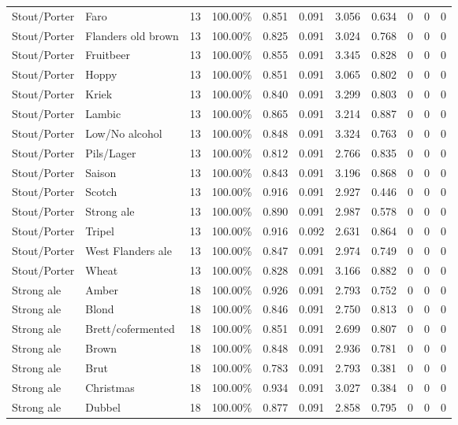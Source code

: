 {\begin{longtable}{llrrrrrrrrr}
Stout/Porter & Faro & 13 & 100.00\% & 0.851 & 0.091 & 3.056 & 0.634 & 0 & 0 & 0 \\
Stout/Porter & Flanders old brown & 13 & 100.00\% & 0.825 & 0.091 & 3.024 & 0.768 & 0 & 0 & 0 \\
Stout/Porter & Fruitbeer & 13 & 100.00\% & 0.855 & 0.091 & 3.345 & 0.828 & 0 & 0 & 0 \\
Stout/Porter & Hoppy & 13 & 100.00\% & 0.851 & 0.091 & 3.065 & 0.802 & 0 & 0 & 0 \\
Stout/Porter & Kriek & 13 & 100.00\% & 0.840 & 0.091 & 3.299 & 0.803 & 0 & 0 & 0 \\
Stout/Porter & Lambic & 13 & 100.00\% & 0.865 & 0.091 & 3.214 & 0.887 & 0 & 0 & 0 \\
Stout/Porter & Low/No alcohol & 13 & 100.00\% & 0.848 & 0.091 & 3.324 & 0.763 & 0 & 0 & 0 \\
Stout/Porter & Pils/Lager & 13 & 100.00\% & 0.812 & 0.091 & 2.766 & 0.835 & 0 & 0 & 0 \\
Stout/Porter & Saison & 13 & 100.00\% & 0.843 & 0.091 & 3.196 & 0.868 & 0 & 0 & 0 \\
Stout/Porter & Scotch & 13 & 100.00\% & 0.916 & 0.091 & 2.927 & 0.446 & 0 & 0 & 0 \\
Stout/Porter & Strong ale & 13 & 100.00\% & 0.890 & 0.091 & 2.987 & 0.578 & 0 & 0 & 0 \\
Stout/Porter & Tripel & 13 & 100.00\% & 0.916 & 0.092 & 2.631 & 0.864 & 0 & 0 & 0 \\
Stout/Porter & West Flanders ale & 13 & 100.00\% & 0.847 & 0.091 & 2.974 & 0.749 & 0 & 0 & 0 \\
Stout/Porter & Wheat & 13 & 100.00\% & 0.828 & 0.091 & 3.166 & 0.882 & 0 & 0 & 0 \\
Strong ale & Amber & 18 & 100.00\% & 0.926 & 0.091 & 2.793 & 0.752 & 0 & 0 & 0 \\
Strong ale & Blond & 18 & 100.00\% & 0.846 & 0.091 & 2.750 & 0.813 & 0 & 0 & 0 \\
Strong ale & Brett/cofermented & 18 & 100.00\% & 0.851 & 0.091 & 2.699 & 0.807 & 0 & 0 & 0 \\
Strong ale & Brown & 18 & 100.00\% & 0.848 & 0.091 & 2.936 & 0.781 & 0 & 0 & 0 \\
Strong ale & Brut & 18 & 100.00\% & 0.783 & 0.091 & 2.793 & 0.381 & 0 & 0 & 0 \\
Strong ale & Christmas & 18 & 100.00\% & 0.934 & 0.091 & 3.027 & 0.384 & 0 & 0 & 0 \\
Strong ale & Dubbel & 18 & 100.00\% & 0.877 & 0.091 & 2.858 & 0.795 & 0 & 0 & 0 \\

\end{longtable}}
